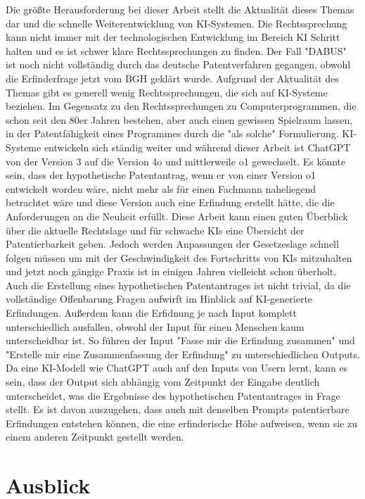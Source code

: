 Die größte Herausforderung bei dieser Arbeit stellt
die Aktualität dieses Themas dar und die 
schnelle Weiterentwicklung von KI-Systemen.
Die Rechtssprechung kann nicht immer mit der 
technologischen Entwicklung im Bereich KI
Schritt halten und es ist schwer
klare Rechtssprechungen zu finden. Der Fall
"DABUS" ist noch nicht vollständig durch das 
deutsche Patentverfahren
gegangen, obwohl die Erfinderfrage jetzt vom
BGH geklärt wurde. Aufgrund der Aktualität des Themas gibt
es generell wenig Rechtssprechungen, die sich auf
KI-Systeme beziehen. Im Gegensatz zu den Rechtssprechungen
zu Computerprogrammen, die schon seit den 80er Jahren
bestehen, aber auch einen gewissen Spielraum lassen,
in der Patentfähigkeit eines Programmes durch die
"als solche" Formulierung. KI-Systeme
entwickeln sich ständig weiter und während dieser Arbeit 
ist ChatGPT von der Version 3 auf die Version 4o und mittlerweile
o1 gewechselt. Es könnte sein, dass der hypothetische
Patentantrag, wenn er von einer Version o1 entwickelt 
worden wäre, nicht mehr als für
einen Fachmann naheliegend betrachtet wäre und diese Version
auch eine Erfindung erstellt hätte, die die Anforderungen an
die Neuheit erfüllt. Diese Arbeit
kann einen guten Überblick über die aktuelle Rechtslage 
und für schwache KIs eine Übersicht der Patentierbarkeit geben.
Jedoch werden Anpassungen der Gesetzeslage schnell 
folgen müssen um mit der Geschwindigkeit des Fortschritts von
KIs mitzuhalten und jetzt noch gängige Praxis ist in 
einigen Jahren vielleicht schon überholt.
Auch die Erstellung eines hypothetischen Patentantrages
ist nicht trivial, da die vollständige Offenbarung
Fragen aufwirft im Hinblick auf KI-generierte 
Erfindungen. Außerdem kann die Erfidnung je nach 
Input komplett unterschiedlich ausfallen, obwohl 
der Input für einen Menschen kaum unterscheidbar ist.
So führen der Input "Fasse mir die Erfindung zusammen"
und "Erstelle mir eine Zusammenfassung der Erfindung" zu
unterschiedlichen Outputs. Da eine KI-Modell wie 
ChatGPT auch auf den Inputs von Usern lernt,
kann es sein, dass der Output sich abhängig vom 
Zeitpunkt der Eingabe deutlich unterscheidet, was die
Ergebnisse des hypothetischen Patentantrages in Frage 
stellt. Es ist davon auszugehen, dass auch mit denselben 
Prompts patentierbare Erfindungen entstehen können, 
die eine erfinderische Höhe aufweisen, wenn sie zu 
einem anderen Zeitpunkt gestellt werden. 

\section{Ausblick\label{sec:outlook}}

